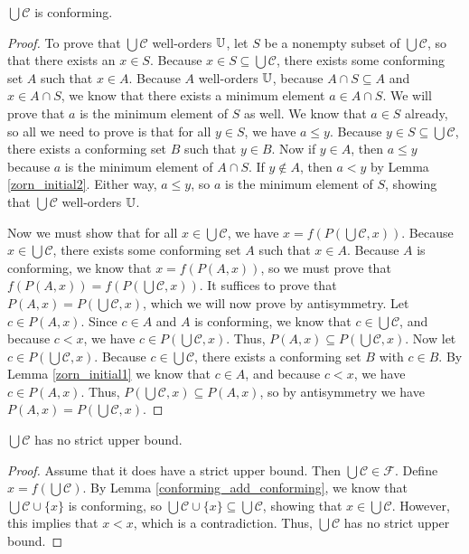 \documentclass[../../math.tex]{subfiles}
\begin{document}
\begin{lemma}
    $\bigcup \mathcal C$ is conforming.
\end{lemma}
\begin{proof}
    To prove that $\bigcup \mathcal C$ well-orders $\mathbb{U}$, let $S$ be a nonempty
    subset of $\bigcup \mathcal C$, so that there exists an $x \in S$.  Because
    $x \in S \subseteq \bigcup \mathcal C$, there exists some conforming set $A$
    such that $x \in A$.  Because $A$ well-orders $\mathbb{U}$, because $A \cap S
    \subseteq A$ and $x \in A \cap S$, we know that there exists a minimum
    element $a \in A \cap S$.  We will prove that $a$ is the minimum element of
    $S$ as well.  We know that $a \in S$ already, so all we need to prove is
    that for all $y \in S$, we have $a \leq y$.  Because $y \in S \subseteq
    \bigcup \mathcal C$, there exists a conforming set $B$ such that $y \in B$.
    Now if $y \in A$, then $a \leq y$ because $a$ is the minimum element of $A
    \cap S$.  If $y \notin A$, then $a < y$ by Lemma \ref{zorn_initial2}.
    Either way, $a \leq y$, so $a$ is the minimum element of $S$, showing that
    $\bigcup \mathcal C$ well-orders $\mathbb{U}$.

    Now we must show that for all $x \in \bigcup \mathcal C$, we have $x =
    f(P(\bigcup \mathcal C, x))$.  Because $x \in \bigcup \mathcal C$, there
    exists some conforming set $A$ such that $x \in A$.  Because $A$ is
    conforming, we know that $x = f(P(A, x))$, so we must prove that $f(P(A, x))
    = f(P(\bigcup \mathcal C, x))$.  It suffices to prove that $P(A, x) =
    P(\bigcup \mathcal C, x)$, which we will now prove by antisymmetry.  Let $c
    \in P(A, x)$.  Since $c \in A$ and $A$ is conforming, we know that $c \in
    \bigcup \mathcal C$, and because $c < x$, we have $c \in P(\bigcup \mathcal
    C, x)$.  Thus, $P(A, x) \subseteq P(\bigcup \mathcal C, x)$.  Now let $c \in
    P(\bigcup \mathcal C, x)$.  Because $c \in \bigcup \mathcal C$, there exists
    a conforming set $B$ with $c \in B$.  By Lemma \ref{zorn_initial1} we know
    that $c \in A$, and because $c < x$, we have $c \in P(A, x)$.  Thus,
    $P(\bigcup \mathcal C, x) \subseteq P(A, x)$, so by antisymmetry we have
    $P(A, x) = P(\bigcup \mathcal C, x)$.
\end{proof}

\begin{lemma} \label{union_no_sub}
    $\bigcup \mathcal C$ has no strict upper bound.
\end{lemma}
\begin{proof}
    Assume that it does have a strict upper bound.  Then $\bigcup \mathcal C \in
    \mathcal F$.  Define $x = f(\bigcup \mathcal C)$.  By Lemma
    \ref{conforming_add_conforming}, we know that $\bigcup \mathcal C \cup
    \{x\}$ is conforming, so $\bigcup \mathcal C \cup \{x\} \subseteq \bigcup
    \mathcal C$, showing that $x \in \bigcup \mathcal C$.  However, this implies
    that $x < x$, which is a contradiction.  Thus, $\bigcup \mathcal C$ has no
    strict upper bound.
\end{proof}
\end{document}
